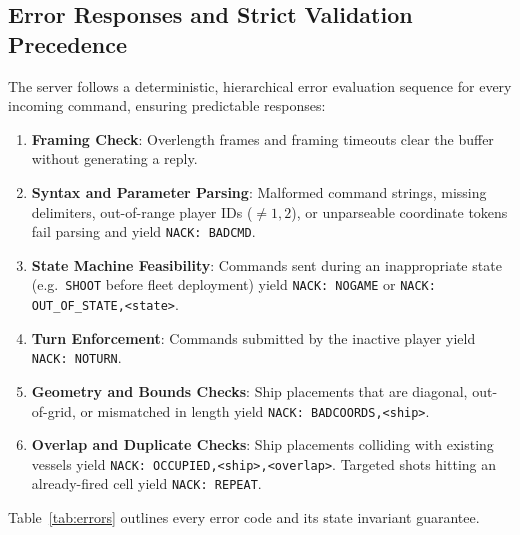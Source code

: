 \subsection{Error Responses and Strict Validation Precedence}
The server follows a deterministic, hierarchical error evaluation sequence for every incoming command, ensuring predictable responses:
\begin{enumerate}
    \item \textbf{Framing Check}: Overlength frames and framing timeouts clear the buffer without generating a reply.
    \item \textbf{Syntax and Parameter Parsing}: Malformed command strings, missing delimiters, out-of-range player IDs ($\ne 1, 2$), or unparseable coordinate tokens fail parsing and yield \texttt{NACK: BADCMD}.
    \item \textbf{State Machine Feasibility}: Commands sent during an inappropriate state (e.g.\ \texttt{SHOOT} before fleet deployment) yield \texttt{NACK: NOGAME} or \texttt{NACK: OUT\_OF\_STATE,<state>}.
    \item \textbf{Turn Enforcement}: Commands submitted by the inactive player yield \texttt{NACK: NOTURN}.
    \item \textbf{Geometry and Bounds Checks}: Ship placements that are diagonal, out-of-grid, or mismatched in length yield \texttt{NACK: BADCOORDS,<ship>}.
    \item \textbf{Overlap and Duplicate Checks}: Ship placements colliding with existing vessels yield \texttt{NACK: OCCUPIED,<ship>,<overlap>}. Targeted shots hitting an already-fired cell yield \texttt{NACK: REPEAT}.
\end{enumerate}
Table~\ref{tab:errors} outlines every error code and its state invariant guarantee.

